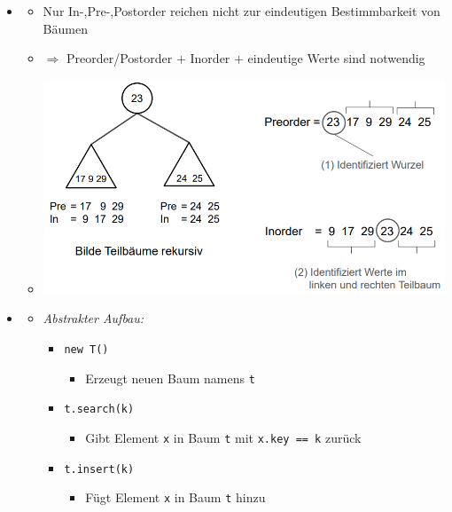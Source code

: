 \documentclass[
    12pt,
    a4paper,
    ngerman,
    color=3b,%
    marginpar=false,
    colorback=false,
    leqno,
]{tudaexercise}
\begin{document}
\begin{itemize}
\begin{itemize}
          \end{itemize}
          \clearpage
    \item {}
          \begin{itemize}
              \item Nur In-,Pre-,Postorder reichen nicht zur eindeutigen Bestimmbarkeit von Bäumen
              \item[] $\Rightarrow$ Preorder/Postorder $+$ Inorder $+$ eindeutige Werte sind notwendig
              \item[] \includegraphics[width=12cm]{pictures/bestimmbarkeitBaum.PNG}
          \end{itemize}


    \item {}
          \begin{itemize}
              \item \textit{Abstrakter Aufbau:}
                    \begin{itemize}
                        \item \texttt{new T()}
                              \begin{itemize}
                                  \item Erzeugt neuen Baum namens \texttt{t}
                              \end{itemize}

                        \item \texttt{t.search(k)}
                              \begin{itemize}
                                  \item Gibt Element \texttt{x} in Baum \texttt{t} mit \texttt{x.key == k} zurück
                              \end{itemize}

                        \item \texttt{t.insert(k)}
                              \begin{itemize}
                                  \item Fügt Element \texttt{x} in Baum \texttt{t} hinzu
                              \end{itemize}


\end{itemize}
\end{itemize}
\end{itemize}
\end{document}
